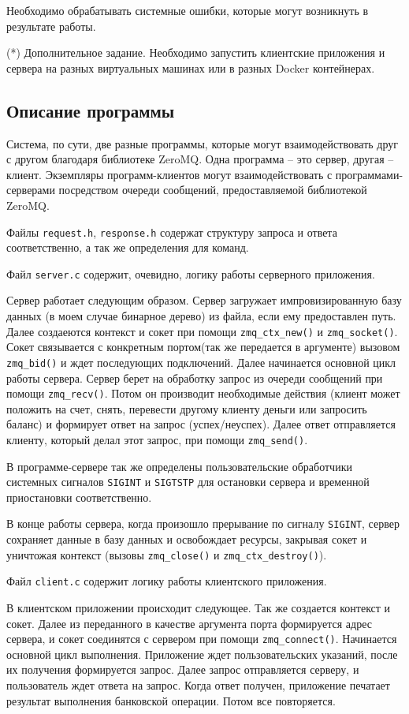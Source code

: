 \documentclass[12pt]{article}
\begin{document}
Необходимо обрабатывать системные ошибки, которые могут возникнуть в результате работы.

(*) Дополнительное задание. Необходимо запустить клиентские приложения и сервера на разных виртуальных машинах или в разных Docker контейнерах.
\subsection*{Описание программы}

Система, по сути, две разные программы, которые могут взаимодействовать друг с другом благодаря библиотеке ZeroMQ.
Одна программа -- это сервер, другая -- клиент. Экземпляры программ-клиентов могут взаимодействовать с программами-серверами посредством очереди сообщений, предоставляемой библиотекой ZeroMQ. 

Файлы \verb|request.h|, \verb|response.h| содержат структуру запроса и ответа соответственно, а так же определения для команд. 

Файл \verb|server.c| содержит, очевидно, логику работы серверного приложения.

Сервер работает следующим образом. Сервер загружает импровизированную базу данных (в моем случае бинарное дерево) из файла, если ему предоставлен путь.
Далее создаеются контекст и сокет при помощи \verb|zmq_ctx_new()| и \verb|zmq_socket()|. Сокет связывается с конкретным портом(так же передается в аргументе) вызовом \verb|zmq_bid()| и ждет последующих подключений. Далее начинается основной цикл работы сервера. Сервер берет на обработку запрос из очереди сообщений при помощи \verb|zmq_recv()|. Потом он производит необходимые действия (клиент может положить на счет, снять, перевести другому клиенту деньги или запросить баланс) и формирует ответ на запрос (успех/неуспех). Далее ответ отправляется клиенту, который делал этот запрос, при помощи \verb|zmq_send()|. 

В программе-сервере так же определены пользовательские обработчики системных сигналов \verb|SIGINT| и \verb|SIGTSTP| для остановки сервера и временной приостановки соответственно.

В конце работы сервера, когда произошло прерывание по сигналу  \verb|SIGINT|, сервер сохраняет данные в базу данных и освобождает ресурсы, закрывая сокет и уничтожая контекст (вызовы \verb|zmq_close()| и \verb|zmq_ctx_destroy()|). 

Файл \verb|client.c| содержит логику работы клиентского приложения.

В клиентском приложении происходит следующее. Так же создается контекст и сокет. Далее из переданного в качестве аргумента порта формируется адрес сервера, и сокет соединятся с сервером при помощи \verb|zmq_connect()|. Начинается основной цикл выполнения. Приложение ждет пользовательских указаний, после их получения формируется запрос. Далее запрос отправляется серверу, и пользователь ждет ответа на запрос. Когда ответ получен, приложение печатает результат выполнения банковской операции. Потом все повторяется.
\end{document}
